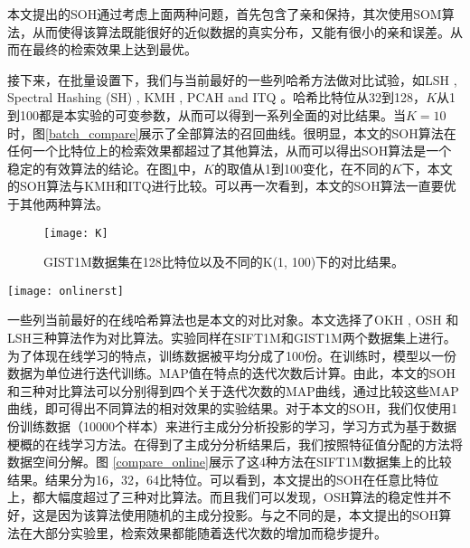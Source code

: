 本文提出的SOH通过考虑上面两种问题，首先包含了亲和保持，其次使用SOM算法，从而使得该算法既能很好的近似数据的真实分布，又能有很小的亲和误差。从而在最终的检索效果上达到最优。

接下来，在批量设置下，我们与当前最好的一些列哈希方法做对比试验，如LSH \cite{gionis1999similarity}, Spectral Hashing (SH) \cite{weiss2009spectral}, KMH \cite{he2013k}, PCAH and ITQ \cite{gong2013iterative}。哈希比特位从32到128，$K$从1到100都是本实验的可变参数，从而可以得到一系列全面的对比结果。当$K=10$时，图\ref{batch_compare}展示了全部算法的召回曲线。很明显，本文的SOH算法在任何一个比特位上的检索效果都超过了其他算法，从而可以得出SOH算法是一个稳定的有效算法的结论。在图\ref{fig_k}中，$K$的取值从1到100变化，在不同的$K$下，本文的SOH算法与KMH和ITQ进行比较。可以再一次看到，本文的SOH算法一直要优于其他两种算法。
\begin{figure}[ht]
	\begin{center}
		\texttt{[image: K]}
		\caption{GIST1M数据集在128比特位以及不同的K(1, 100)下的对比结果。}
		\label{fig_k}
	\end{center}
\end{figure}
\begin{figure*}[ht]
	\begin{center}
		\texttt{[image: onlinerst]}
		\caption{(a)(b)(c)SIFT1M数据集上使用16，32，64比特位的MAP曲线。本文的SOH在16和32比特位下均设定b=2，在64比特位下设定b=4。在该幅图中，正样本是欧式距离最小的前K=10的近邻点。该幅图使用彩色版本观看最佳。 }
		\label{compare_online}
	\end{center}
\end{figure*}

一些列当前最好的在线哈希算法也是本文的对比对象。本文选择了OKH \cite{huang2013online}, OSH \cite{leng2015online}和LSH三种算法作为对比算法。实验同样在SIFT1M和GIST1M两个数据集上进行。为了体现在线学习的特点，训练数据被平均分成了100份。在训练时，模型以一份数据为单位进行迭代训练。MAP值在特点的迭代次数后计算。由此，本文的SOH和三种对比算法可以分别得到四个关于迭代次数的MAP曲线，通过比较这些MAP曲线，即可得出不同算法的相对效果的实验结果。对于本文的SOH，我们仅使用1份训练数据（10000个样本）来进行主成分分析投影的学习，学习方式为基于数据梗概的在线学习方法。在得到了主成分分析结果后，我们按照特征值分配的方法将数据空间分解。图 \ref{compare_online}展示了这4种方法在SIFT1M数据集上的比较结果。结果分为16，32，64比特位。可以看到，本文提出的SOH在任意比特位上，都大幅度超过了三种对比算法。而且我们可以发现，OSH算法的稳定性并不好，这是因为该算法使用随机的主成分投影。与之不同的是，本文提出的SOH算法在大部分实验里，检索效果都能随着迭代次数的增加而稳步提升。

